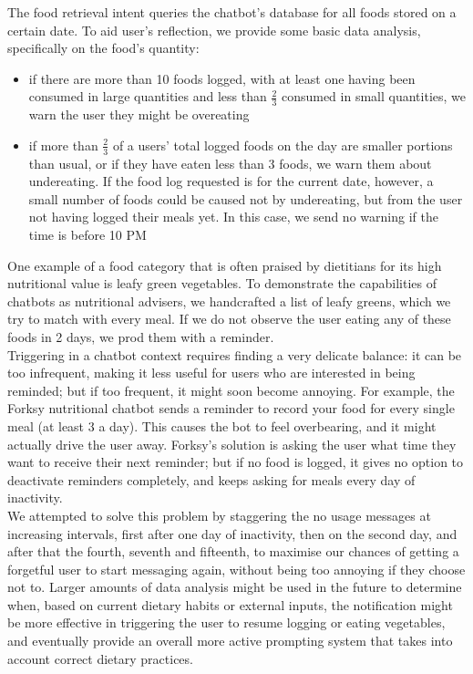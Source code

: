 The food retrieval intent queries the chatbot's database for all foods stored on a certain date. To aid user's reflection, we provide some basic data analysis, specifically on the food's quantity: 
\begin{itemize}
\item if there are more than 10 foods logged, with at least one having been consumed in large quantities and less than $\frac{2}{3}$ consumed in small quantities, we warn the user they might be overeating
\item if more than $\frac{2}{3}$ of a users' total logged foods on the day are smaller portions than usual, or if they have eaten less than 3 foods, we warn them about undereating. If the food log requested is for the current date, however, a small number of foods could be caused not by undereating, but from the user not having logged their meals yet. In this case, we send no warning if the time is before 10 PM
\end{itemize}

One example of a food category that is often praised by dietitians for its high nutritional value \cite{bishoppgreens} is leafy green vegetables. To demonstrate the capabilities of chatbots as nutritional advisers, we handcrafted a list of leafy greens, which we try to match with every meal. If we do not observe the user eating any of these foods in 2 days, we prod them with a reminder. \\
Triggering in a chatbot context requires finding a very delicate balance: it can be too infrequent, making it less useful for users who are interested in being reminded; but if too frequent, it  might soon become annoying. For example, the Forksy nutritional chatbot \cite{forksywebsite} sends a reminder to record your food for every single meal (at least 3 a day). This causes the bot to feel overbearing, and it might actually drive the user away. Forksy's solution is asking the user what time they want to receive their next reminder; but if no food is logged, it gives no option to deactivate reminders completely, and keeps asking for meals every day of inactivity. \\
We attempted to solve this problem by staggering the no usage messages at increasing intervals, first after one day of inactivity, then on the second day, and after that the fourth, seventh and fifteenth, to maximise our chances of getting a forgetful user to start messaging again, without being too annoying if they choose not to. Larger amounts of data analysis might be used in the future to determine when, based on current dietary habits or external inputs, the notification might be more effective in triggering the user to resume logging or eating vegetables, and eventually provide an overall more active prompting system that takes into account correct dietary practices.

